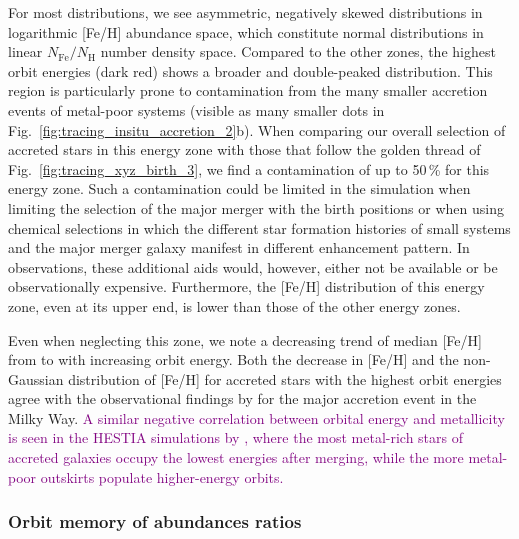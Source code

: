 \documentclass[fleqn,usenatbib]{mnras}
\newcommand{\changed}[1]{{\textcolor{purple}{#1}}}
\begin{document}
For most distributions, we see asymmetric, negatively skewed distributions in logarithmic [Fe/H] abundance space, which constitute normal distributions in linear $N_\mathrm{Fe}/N_\mathrm{H}$ number density space. Compared to the other zones, the highest orbit energies (dark red) shows a broader and double-peaked distribution. This region is particularly prone to contamination from the many smaller accretion events of metal-poor systems (visible as many smaller dots in Fig.~\ref{fig:tracing_insitu_accretion_2}b). When comparing our overall selection of accreted stars in this energy zone with those that follow the golden thread of Fig.~\ref{fig:tracing_xyz_birth_3}, we find a contamination of up to 50\,\% for this energy zone. Such a contamination could be limited in the simulation when limiting the selection of the major merger with the birth positions or when using chemical selections in which the different star formation histories of small systems and the major merger galaxy manifest in different enhancement pattern. In observations, these additional aids would, however, either not be available or be observationally expensive. Furthermore, the [Fe/H] distribution of this energy zone, even at its upper end, is lower than those of the other energy zones.

Even when neglecting this zone, we note a decreasing trend of median [Fe/H] from  to  with increasing orbit energy. Both the decrease in [Fe/H] and the non-Gaussian distribution of [Fe/H] for accreted stars with the highest orbit energies agree with the observational findings by \citet[][see their Fig.~3]{Skuladottir2025} for the major accretion event in the Milky Way. \changed{A similar negative correlation between orbital energy and metallicity is seen in the HESTIA simulations by \citet[][see their Figs.~8 and~9]{Khoperskov2023c}, where the most metal-rich stars of accreted galaxies occupy the lowest energies after merging, while the more metal-poor outskirts populate higher-energy orbits.}

\subsubsection{Orbit memory of abundances ratios}
\end{document}
